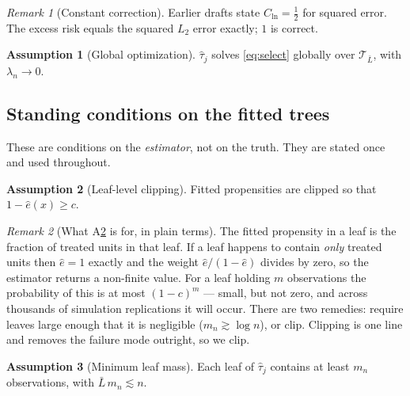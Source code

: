 \documentclass[11pt]{article}
\theoremstyle{plain}
\theoremstyle{definition}
\newtheorem{assumption}{Assumption}
\theoremstyle{remark}
\newtheorem{remark}{Remark}
\newcommand{\cT}{\mathcal{T}}
\newcommand{\ehat}{\widehat{e}}
\newcommand{\that}{\widehat{\tau}}
\begin{document}
\begin{remark}[Constant correction]
Earlier drafts state $C_{\mathrm{ln}}=\tfrac12$ for squared error. The excess
risk equals the squared $L_2$ error exactly; $1$ is correct.
\end{remark}

\begin{assumption}[Global optimization]\label{ass:global}
$\that_j$ solves \eqref{eq:select} globally over $\cT_{\bar L}$, with
$\lambda_n\to0$.
\end{assumption}

\subsection{Standing conditions on the fitted trees}

These are conditions on the \emph{estimator}, not on the truth. They are stated
once and used throughout.

\begin{assumption}[Leaf-level clipping]\label{ass:clip}
Fitted propensities are clipped so that $1-\ehat(x)\ge c$.
\end{assumption}

\begin{remark}[What A\ref{ass:clip} is for, in plain terms]\label{rem:clip}
The fitted propensity in a leaf is the fraction of treated units in that leaf.
If a leaf happens to contain \emph{only} treated units then $\ehat=1$ exactly and
the weight $\ehat/(1-\ehat)$ divides by zero, so the estimator returns a
non-finite value. For a leaf holding $m$ observations the probability of this is
at most $(1-c)^m$ --- small, but not zero, and across thousands of simulation
replications it will occur. There are two remedies: require leaves large enough
that it is negligible ($m_n\gtrsim\log n$), or clip. Clipping is one line and
removes the failure mode outright, so we clip.
\end{remark}

\begin{assumption}[Minimum leaf mass]\label{ass:mass}
Each leaf of $\that_j$ contains at least $m_n$ observations, with
$\bar L\,m_n\lesssim n$.
\end{assumption}
\end{document}
